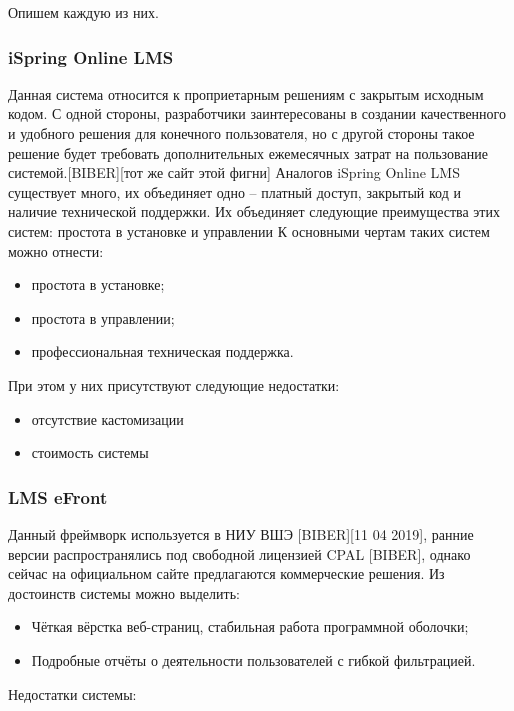 \documentclass[a4paper,14pt]{article}
\begin{document}
Опишем каждую из них.

\subsubsection{iSpring Online LMS}

Данная система относится к проприетарным решениям с закрытым исходным кодом.
С одной стороны, разработчики заинтересованы в создании качественного и удобного решения для конечного пользователя, но с другой стороны такое решение будет требовать дополнительных ежемесячных затрат на пользование системой.[BIBER][тот же сайт этой фигни]
Аналогов iSpring Online LMS существует много, их объединяет одно -- платный доступ, закрытый код и наличие технической поддержки.
Их объединяет следующие преимущества этих систем: простота в установке и управлении
К основными чертам таких систем можно отнести:
\begin{itemize}
	\item простота в установке;
	\item простота в управлении;	
	\item профессиональная техническая поддержка.
\end{itemize}

При этом у них присутствуют следующие недостатки:
\begin{itemize}
	\item отсутствие кастомизации
	\item стоимость системы
\end{itemize} 

\subsubsection{LMS eFront}

Данный фреймворк используется в НИУ ВШЭ [BIBER][11 04 2019], ранние версии распространялись под свободной лицензией CPAL [BIBER], однако сейчас на официальном сайте предлагаются коммерческие решения.
Из достоинств системы можно выделить:

\begin{itemize}
	\item Чёткая вёрстка веб-страниц, стабильная работа программной оболочки;
	\item Подробные отчёты о деятельности пользователей с гибкой фильтрацией.	
\end{itemize} 

Недостатки системы:
\end{document}
